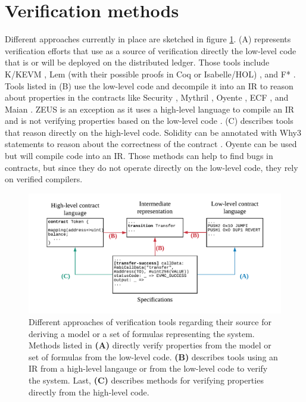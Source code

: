 \section{Verification methods}
\label{verification}

Different approaches currently in place are sketched in figure \ref{fig:ver}. 
(A) represents verification efforts that use as a source of verification directly the low-level code that is or will be deployed on the distributed ledger. Those tools include K/KEVM \cite{Hildenbrandt2017}, Lem (with their possible proofs in Coq or Isabelle/HOL) \cite{Hirai2017}, and F* \cite{Bhargavan2016,Grishchenko2018}.
Tools listed in (B) use the low-level code and decompile it into an IR to reason about properties in the contracts like Security \cite{Tsankov2017}, Mythril \cite{Mueller2018}, Oyente \cite{Luu2016,Albert2018}, ECF \cite{Grossman2017}, and Maian \cite{Nikolic2018}. ZEUS is an exception as it uses a high-level language to compile an IR and is not verifying properties based on the low-level code \cite{Kalra2018}.
(C) describes tools that reason directly on the high-level code. Solidity can be annotated with Why3 statements to reason about the correctness of the contract \cite{Reitwiessner2015Why3}. Oyente can be used but will compile code into an IR. Those methods can help to find bugs in contracts, but since they do not operate directly on the low-level code, they rely on verified compilers.


\begin{figure}
\label{fig:ver}
\includegraphics[width=\textwidth]{fig/Verification.pdf}
\caption{Different approaches of verification tools regarding their source for deriving a model or a set of formulas representing the system. Methods listed in \textbf{(A)} directly verify properties from the model or set of formulas from the low-level code. \textbf{(B)} describes tools using an IR from a high-level langauge or from the low-level code to verify the system. Last, \textbf{(C)} describes methods for verifying properties directly from the high-level code.}
\end{figure}

